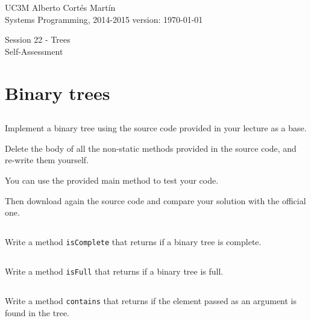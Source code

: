 \documentclass[a4paper, 11pt]{article}
\newcommand{\realtitle}{Session 22 - Trees}
\begin{document}
\makebox[\linewidth]{\rule{\textwidth}{0.4pt}}
UC3M \hfill Alberto Cortés Martín\\
Systems Programming, 2014-2015 \hfill version: \today\\
\makebox[\linewidth]{\rule{\textwidth}{0.4pt}}
\begin{center}
  \Large{\realtitle}\\Self-Assessment
\end{center}
\makebox[\linewidth]{\rule{\textwidth}{0.4pt}}
\vspace{1cm}

\section{Binary trees}

\subsection{}

Implement a binary tree using the source code provided in your lecture as a base.

Delete the body of all the non-static methods provided in the source code, and re-write them yourself.

You can use the provided main method to test your code.

Then download again the source code and compare your solution with the official one.

\subsection{}

Write a method \texttt{isComplete} that returns if a binary tree is complete.

\subsection{}

Write a method \texttt{isFull} that returns if a binary tree is full.

\subsection{}

Write a method \texttt{contains} that returns if the element passed as an argument is found in the tree.

\subsection{}
\end{document}
